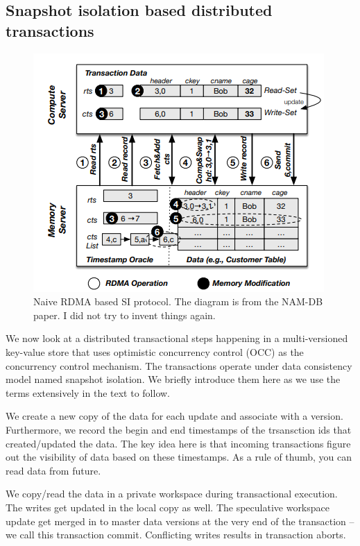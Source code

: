 \subsection{Snapshot isolation based distributed transactions}

\begin{figure}[]   
	  \centering
		  \includegraphics[width=\linewidth]{figures/SI.png} 
			  \caption{\small Naive RDMA based SI protocol. The diagram is from the NAM-DB paper. I did not try to invent things again.} 
				  \label{fig:si} 
				\end{figure}

We now look at a distributed transactional steps happening in a 
multi-versioned key-value store that uses optimistic concurrency control (OCC)
as the concurrency control mechanism. The transactions operate under data consistency
model named snapshot isolation. We briefly introduce them here as we use the terms 
extensively in the text to follow.

We create a new copy of the data for each update and associate with a version. Furthermore, we record the 
begin and end timestamps of the trsansction ids that created/updated the data. The key idea here is that
incoming transactions figure out the visibility of data based on these timestamps. As a rule of thumb, you
can read data from future.

We copy/read the data in a private workspace during transactional execution. The writes get updated in the 
local copy as well. The speculative workspace update get merged in to master data versions at the very
end of the transaction -- we call this transaction commit. Conflicting writes results in transaction aborts.

